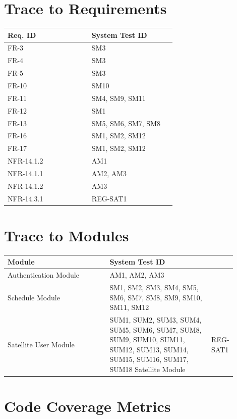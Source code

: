 \documentclass[12pt, titlepage]{article}
\begin{document}
\section{Trace to Requirements}
\begin{longtable}{|p{0.45\linewidth}|p{0.45\linewidth}|}
\hline
\textbf{Req. ID} & \textbf{System Test ID} \\
\hline
FR-3 & SM3 \\
\hline
FR-4 & SM3 \\
\hline
FR-5 & SM3 \\
\hline
FR-10 & SM10 \\
\hline
FR-11 & SM4, SM9, SM11 \\
\hline
FR-12 & SM1 \\
\hline
FR-13 & SM5, SM6, SM7, SM8 \\
\hline
FR-16 & SM1, SM2, SM12 \\
\hline
FR-17 & SM1, SM2, SM12 \\
\hline
NFR-14.1.2 & AM1 \\
\hline
NFR-14.1.1 & AM2, AM3 \\
\hline
NFR-14.1.2 & AM3 \\
\hline
NFR-14.3.1 & REG-SAT1 \\
\hline
\end{longtable}


\section{Trace to Modules}	

\begin{longtable}{|p{0.45\linewidth}|p{0.45\linewidth}|}
\hline
\textbf{Module} & \textbf{System Test ID} \\
\hline
Authentication Module & AM1, AM2, AM3 \\
\hline
Schedule Module & SM1, SM2, SM3, SM4, SM5, SM6, SM7, SM8, SM9, SM10, SM11, SM12 \\
\hline
Satellite User Module & SUM1, SUM2, SUM3, SUM4, SUM5, SUM6, SUM7, SUM8, SUM9, SUM10, SUM11, SUM12, SUM13, SUM14, SUM15, SUM16, SUM17, SUM18
\hline
Satellite Module & REG-SAT1 \\
\hline
\end{longtable}

\section{Code Coverage Metrics}
\end{document}
